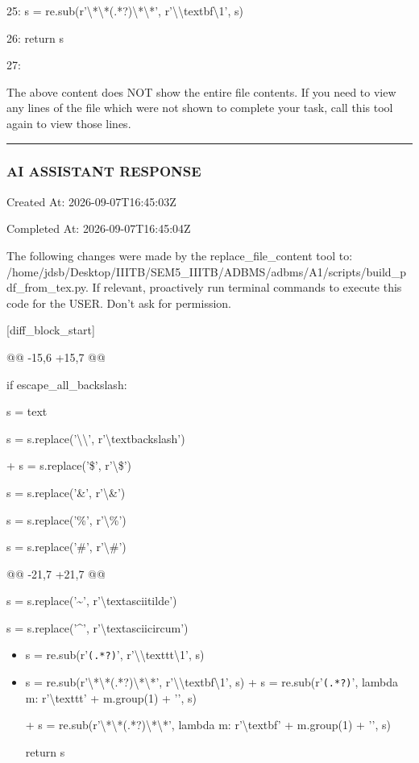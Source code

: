 \documentclass[11pt,a4paper]{article}
\begin{document}
25:         s = re.sub(r'\textbackslash{}*\textbackslash{}*(.*?)\textbackslash{}*\textbackslash{}*', r'\textbackslash{}\textbackslash{}textbf{\textbackslash{}1}', s)

26:         return s

27:

The above content does NOT show the entire file contents. If you need to view any lines of the file which were not shown to complete your task, call this tool again to view those lines.


\hrule

\subsubsection{AI ASSISTANT RESPONSE}

Created At: 2026-09-07T16:45:03Z

Completed At: 2026-09-07T16:45:04Z

The following changes were made by the replace\_file\_content tool to: /home/jdsb/Desktop/IIITB/SEM5\_IIITB/ADBMS/adbms/A1/scripts/build\_pdf\_from\_tex.py. If relevant, proactively run terminal commands to execute this code for the USER. Don't ask for permission.

[diff\_block\_start]

@@ -15,6 +15,7 @@

if escape\_all\_backslash:

s = text

s = s.replace('\textbackslash{}\textbackslash{}', r'\textbackslash{}textbackslash{}')

+        s = s.replace('\$', r'\textbackslash{}\$')

s = s.replace('\&', r'\textbackslash{}\&')

s = s.replace('\%', r'\textbackslash{}\%')

s = s.replace('\#', r'\textbackslash{}\#')

@@ -21,7 +21,7 @@

s = s.replace('\textasciitilde{}', r'\textbackslash{}textasciitilde{}')

s = s.replace('\textasciicircum{}', r'\textbackslash{}textasciicircum{}')

\begin{itemize}
\item        s = re.sub(r'\texttt{(.*?)}', r'\textbackslash{}\textbackslash{}texttt{\textbackslash{}1}', s)
\item        s = re.sub(r'\textbackslash{}*\textbackslash{}*(.*?)\textbackslash{}*\textbackslash{}*', r'\textbackslash{}\textbackslash{}textbf{\textbackslash{}1}', s)
+        s = re.sub(r'\texttt{(.*?)}', lambda m: r'\textbackslash{}texttt{' + m.group(1) + '}', s)

+        s = re.sub(r'\textbackslash{}*\textbackslash{}*(.*?)\textbackslash{}*\textbackslash{}*', lambda m: r'\textbackslash{}textbf{' + m.group(1) + '}', s)

return s

\end{itemize}
\end{document}
